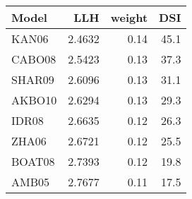 \begin{tabular}{lrrr}
\toprule
  Model &     LLH &  weight &   DSI \\
\midrule
  KAN06 &  2.4632 &    0.14 &  45.1 \\
 CABO08 &  2.5423 &    0.13 &  37.3 \\
 SHAR09 &  2.6096 &    0.13 &  31.1 \\
 AKBO10 &  2.6294 &    0.13 &  29.3 \\
  IDR08 &  2.6635 &    0.12 &  26.3 \\
  ZHA06 &  2.6721 &    0.12 &  25.5 \\
 BOAT08 &  2.7393 &    0.12 &  19.8 \\
  AMB05 &  2.7677 &    0.11 &  17.5 \\
\bottomrule
\end{tabular}
